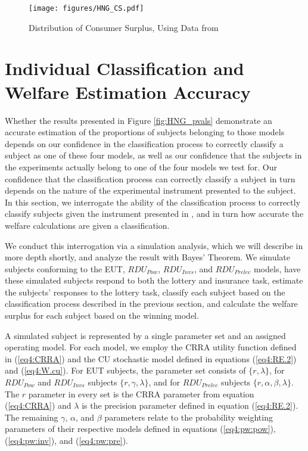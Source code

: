\documentclass[../main.tex]{subfiles}
\providecommand{\DIFaddbeginFL}{} %
\providecommand{\DIFaddendFL}{} %
\providecommand{\DIFdelbeginFL}{} %
\providecommand{\DIFdelendFL}{} %
\begin{document}
\begin{figure}[h!]
	\center
	\caption{Distribution of Consumer Surplus, Using Data from \textcite{Harrison2016}}
	\DIFdelbeginFL %
\DIFdelendFL \DIFaddbeginFL \texttt{[image: figures/HNG\_CS.pdf]}
	\DIFaddendFL \label{fig:HNG_CS}
\end{figure}

\section{Individual Classification and Welfare Estimation Accuracy}

Whether the results presented in Figure \ref{fig:HNG_pvals} demonstrate an accurate estimation of the proportions of subjects belonging to those models depends on our confidence in the classification process to correctly classify a subject as one of these four models, as well as our confidence that the subjects in the experiments actually belong to one of the four models we test for.
Our confidence that the classification process can correctly classify a subject in turn depends on the nature of the experimental instrument presented to the subject.
In this section, we interrogate the ability of the classification process to correctly classify subjects given the instrument presented in \textcite{Harrison2016}, and in turn how accurate the welfare calculations are given a classification.

We conduct this interrogation via a simulation analysis, which we will describe in more depth shortly, and analyze the result with Bayes' Theorem.
We simulate subjects conforming to the EUT, $\mathit{RDU_{Pow}}$, $\mathit{RDU_{Invs}}$, and $\mathit{RDU_{Prelec}}$ models, have these simulated subjects respond to both the lottery and insurance task, estimate the subjects' responses to the lottery task, classify each subject based on the classification process described in the previous section, and calculate the welfare surplus for each subject based on the winning model.

A simulated subject is represented by a single parameter set and an assigned operating model.
For each model, we employ the CRRA utility function defined in (\ref{eq4:CRRA}) and the CU stochastic model defined in equations (\ref{eq4:RE.2}) and (\ref{eq4:W.cu}).
For EUT subjects, the parameter set consists of $\lbrace r, \lambda \rbrace$, for $\mathit{RDU_{Pow}}$ and $\mathit{RDU_{Invs}}$ subjects $\lbrace r, \gamma, \lambda \rbrace$, and for $\mathit{RDU_{Prelec}}$ subjects $\lbrace r, \alpha, \beta, \lambda \rbrace$.
The $r$ parameter in every set is the CRRA parameter from equation (\ref{eq4:CRRA}) and $\lambda$ is the precision parameter defined in equation (\ref{eq4:RE.2}).
The remaining $\gamma$, $\alpha$, and $\beta$ parameters relate to the probability weighting parameters of their respective models defined in equations (\ref{eq4:pw:pow}), (\ref{eq4:pw:inv}), and (\ref{eq4:pw:pre}).
\end{document}
